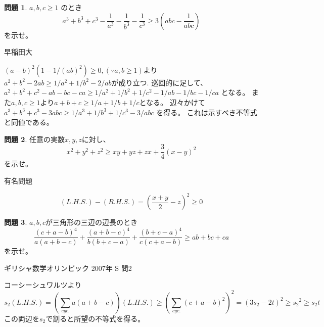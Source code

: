 \documentclass[uplatex, a5paper]{jsarticle}
\makeatletter
\theoremstyle{definition}
\newtheorem{prob}{問題}
\renewenvironment{proof}[1][\proofname]{
  \pushQED{\qed}%
  \normalfont \topsep6\p@\@plus6\p@\relax
  \trivlist
  \item[\hskip\labelsep
    #1\@addpunct{\textbf{.}}]\ignorespaces
}{%
  \popQED\endtrivlist\@endpefalse
}
\providecommand{\proofname}{証明}
\newcommand{\lhs }{ L.H.S. }
\newcommand{\rhs }{ R.H.S. }
\def\qed{\hfill $\Box$}
\makeatother
\begin{document}
\newpage

\begin{prob}
  \(a , b , c \geq 1\)
  のとき
  \[
  a^3 + b^3 + c^3 - \frac{1}{a^3} - \frac{1}{b^3} - \frac{1}{c^3}
  \geq 3 \left( abc - \frac{1}{abc} \right)
  \]
  を示せ。
  \begin{flushright}
    早稲田大
  \end{flushright}
\end{prob}


\begin{proof}
  \((a-b)^2(1-1/(ab)^2) \geq 0 , ( \because a,b \geq 1 )\)より
  \(a^2+b^2-2ab \geq 1/a^2 + 1/b^2 -2/ab\)が成り立つ.
  巡回的に足して、
  \(a^2+b^2+c^2 -ab-bc-ca \geq 1/a^2+1/b^2+1/c^2 -1/ab-1/bc-1/ca\)
  となる。
  また\(a,b,c \geq 1\)より\(a+b+c \geq 1/a+1/b+1/c\)となる。
  辺々かけて
  \(a^3+b^3+c^3 - 3abc \geq 1/a^3 + 1/b^3 + 1/c^3 - 3/abc\)
  を得る。
  これは示すべき不等式と同値である。
\end{proof}










\newpage

\begin{prob}
  任意の実数\(x,y,z\)に対し、
  \[
  x^2+y^2+z^2 \geq xy+yz+zx + \frac{3}{4}(x-y)^2
  \]
  を示せ。
  \begin{flushright}
    有名問題
  \end{flushright}
\end{prob}


\begin{proof}
  \[
  ( \lhs ) - ( \rhs ) = \left( \frac{x+y}{2} - z \right) ^2 \geq 0
  \]
\end{proof}










\newpage

\begin{prob}
  \(a,b,c\)が三角形の三辺の辺長のとき
  \[
  \frac{(c+a-b)^4}{a(a+b-c)} + \frac{(a+b-c)^4}{b(b+c-a)} + \frac{(b+c-a)^4}{c(c+a-b)} \geq ab+bc+ca
  \]
  を示せ。
  \begin{flushright}
    ギリシャ数学オリンピック 2007年 S 問2
  \end{flushright}
\end{prob}


\begin{proof}
  コーシーシュワルツより
  \[
  s_2 ( \lhs )
  = \left( \sum_{cyc.} a(a+b-c) \right) ( \lhs )
  \geq \left( \sum_{cyc.} (c+a-b)^2 \right) ^2
  = ( 3s_2 -2t )^2 \geq {s_2}^2 \geq s_2t
  \]
  この両辺を\(s_2\)で割ると所望の不等式を得る。
\end{proof}
\end{document}
